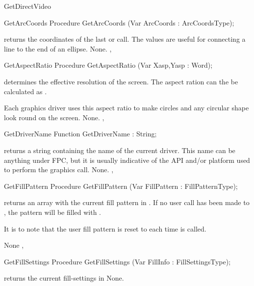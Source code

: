 \begin{function}{GetDirectVideo}
\begin{procedure}{GetArcCoords}
\Declaration
Procedure GetArcCoords (Var ArcCoords : ArcCoordsType);

\Description
{} returns the coordinates of the last  or
 call. The values are useful for connecting a line to
the end of an ellipse.
\Errors
None.
\SeeAlso
{}, 
\end{procedure}

\begin{procedure}{GetAspectRatio}
\Declaration
Procedure GetAspectRatio (Var Xasp,Yasp : Word);

\Description
{} determines the effective resolution of the screen. The aspect ration can
the be calculated as .

Each graphics driver uses this aspect ratio to make circles and any circular
shape look round on the screen.
\Errors
None.
\SeeAlso
{},
\end{procedure}


\begin{function}{GetDriverName}
\Declaration
Function GetDriverName  : String;

\Description
{} returns a string containing the name of the
current driver. This name can be anything under FPC, but it is
usually indicative of the API and/or platform used to perform the
graphics call.
\Errors
None.
\SeeAlso
{}, 
\end{function}

\begin{procedure}{GetFillPattern}
\Declaration
Procedure GetFillPattern (Var FillPattern : FillPatternType);

\Description
{} returns an array with the current fill pattern in .
If no user call has been made to , the pattern will be
filled with .

It is to note that the user fill pattern is reset to  each time
 is called.

\Errors
None
\SeeAlso
{}, 
\end{procedure}

\begin{procedure}{GetFillSettings}
\Declaration
Procedure GetFillSettings (Var FillInfo : FillSettingsType);

\Description
{} returns the current fill-settings in
\Errors
None.
\SeeAlso
{}
\end{procedure}


\end{function}
